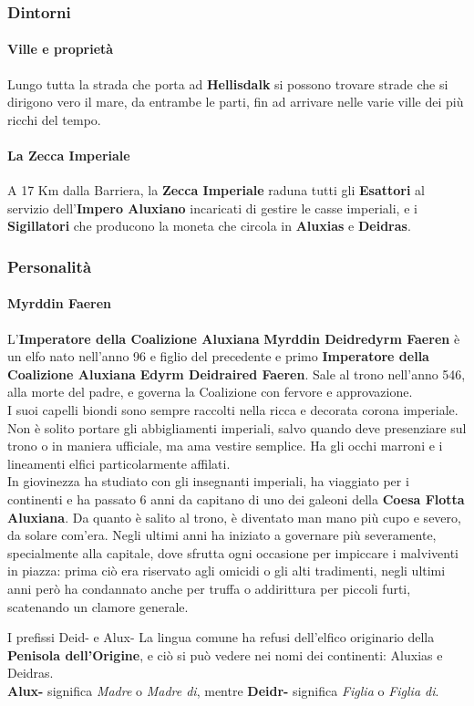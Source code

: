 \documentclass[10pt,twoside,onecolumn,openany]{book}
\begin{document}
\subsubsection{Dintorni}
\paragraph{Ville e proprietà}
Lungo tutta la strada che porta ad \textbf{Hellisdalk} si possono trovare strade che si dirigono vero il mare, da entrambe le parti, fin ad arrivare nelle varie ville dei più ricchi del tempo.
\paragraph{La Zecca Imperiale}
A 17 Km dalla Barriera, la \textbf{Zecca Imperiale} raduna tutti gli \textbf{Esattori} al servizio dell'\textbf{Impero Aluxiano} incaricati di gestire le casse imperiali, e i \textbf{Sigillatori} che producono la moneta che circola in \textbf{Aluxias} e \textbf{Deidras}.
\subsubsection{Personalità}
\paragraph{Myrddin Faeren}
L'\textbf{Imperatore della Coalizione Aluxiana} \textbf{Myrddin Deidredyrm Faeren} è un elfo nato nell'anno 96 e figlio del precedente e primo \textbf{Imperatore della Coalizione Aluxiana} \textbf{Edyrm Deidraired Faeren}. Sale al trono nell'anno 546, alla morte del padre, e governa la Coalizione con fervore e approvazione.\\
I suoi capelli biondi sono sempre raccolti nella ricca e decorata corona imperiale. Non è solito portare gli abbigliamenti imperiali, salvo quando deve presenziare sul trono o in maniera ufficiale, ma ama vestire semplice. Ha gli occhi marroni e i lineamenti elfici particolarmente affilati.\\
In giovinezza ha studiato con gli insegnanti imperiali, ha viaggiato per i continenti e ha passato 6 anni da capitano di uno dei galeoni della \textbf{Coesa Flotta Aluxiana}. Da quanto è salito al trono, è diventato man mano più cupo e severo, da solare com'era. Negli ultimi anni ha iniziato a governare più severamente, specialmente alla capitale, dove sfrutta ogni occasione per impiccare i malviventi in piazza: prima ciò era riservato agli omicidi o gli alti tradimenti, negli ultimi anni però ha condannato anche per truffa o addirittura per piccoli furti, scatenando un clamore generale.
\begin{commentbox}{{I prefissi Deid- e Alux-}}
La lingua comune ha refusi dell'elfico originario della \textbf{Penisola dell'Origine}, e ciò si può vedere nei nomi dei continenti: Aluxias e Deidras.\\
\textbf{Alux-} significa \textit{Madre} o \textit{Madre di}, mentre \textbf{Deidr-} significa \textit{Figlia} o \textit{Figlia di}.
\end{commentbox}
\end{document}
